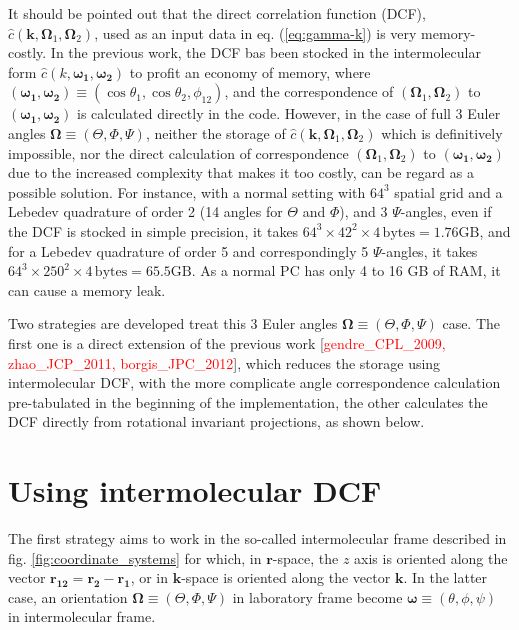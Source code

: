 It should be pointed out that the direct correlation function (\acs{DCF}),
$\hat{c}(\mathbf{k},\mathbf{\Omega}_{1},\mathbf{\Omega}_{2})$, used
as an input data in eq. (\ref{eq:gamma-k}) is very memory-costly.
In the previous work, the \acs{DCF} bas been stocked in the intermolecular
form $\hat{c}(k,\boldsymbol{\omega_{1}},\boldsymbol{\omega_{2}})$
to profit an economy of memory, where $(\boldsymbol{\omega_{1}},\boldsymbol{\omega_{2}})\equiv(\cos\theta_{1},\cos\theta_{2},\phi_{12})$,
and the correspondence of $(\mathbf{\Omega}_{1},\mathbf{\Omega}_{2})$
to $(\boldsymbol{\omega_{1}},\boldsymbol{\omega_{2}})$ is calculated
directly in the code. However, in the case of full 3 Euler angles
$\mathbf{\Omega}\equiv(\Theta,\Phi,\Psi)$, neither the storage of
$\hat{c}(\mathbf{k},\mathbf{\Omega}_{1},\mathbf{\Omega}_{2})$ which
is definitively impossible, nor the direct calculation of correspondence
$(\mathbf{\Omega}_{1},\mathbf{\Omega}_{2})$ to $(\boldsymbol{\omega_{1}},\boldsymbol{\omega_{2}})$
due to the increased complexity that makes it too costly, can be regard
as a possible solution. For instance, with a normal setting with $64^{3}$
spatial grid and a Lebedev quadrature of order 2 (14 angles for $\Theta$
and $\Phi$), and 3 $\Psi$-angles, even if the \acs{DCF} is stocked
in simple precision, it takes $64^{3}\times42^{2}\times4\,\mathrm{bytes}=1.76\mathrm{GB}$,
and for a Lebedev quadrature of order 5 and correspondingly 5 $\Psi$-angles,
it takes $64^{3}\times250^{2}\times4\,\mathrm{bytes}=65.5\mathrm{GB}$.
As a normal PC has only 4 to 16 GB of RAM, it can cause a memory leak. 

Two strategies are developed treat this 3 Euler angles $\mathbf{\Omega}\equiv(\Theta,\Phi,\Psi)$
case. The first one is a direct extension of the previous work {[}\textcolor{red}{gendre\_CPL\_2009,
zhao\_JCP\_2011, borgis\_JPC\_2012}{]}, which reduces the storage
using intermolecular \acs{DCF}, with the more complicate angle correspondence
calculation pre-tabulated in the beginning of the implementation,
the other calculates the \acs{DCF} directly from rotational invariant
projections, as shown below.

\section{Using intermolecular DCF}

The first strategy aims to work in the so-called intermolecular frame
described in fig. \ref{fig:coordinate_systems} for which, in $\mathbf{r}$-space,
the $z$ axis is oriented along the vector $\mathbf{r_{12}}=\mathbf{r_{2}}-\mathbf{r_{1}}$,
or in $\mathbf{k}$-space is oriented along the vector $\mathbf{k}$.
In the latter case, an orientation $\mathbf{\Omega}\equiv(\Theta,\Phi,\Psi)$
in laboratory frame become $\boldsymbol{\omega}\equiv(\theta,\phi,\psi)$
in intermolecular frame. 


